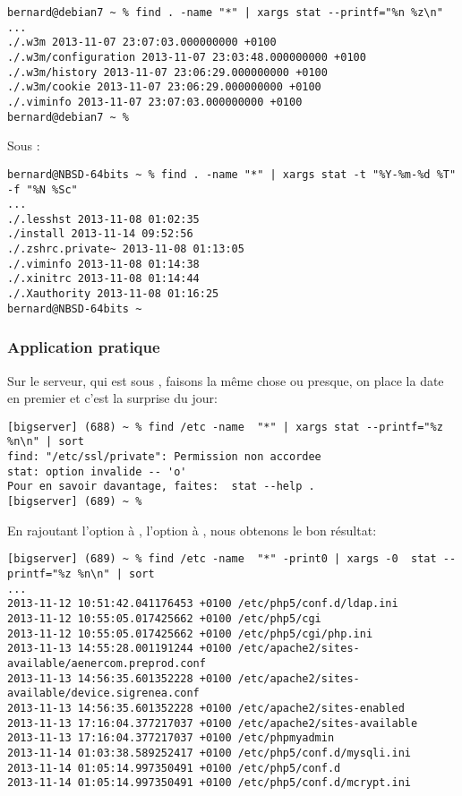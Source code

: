 \begin{lstlisting}
bernard@debian7 ~ % find . -name "*" | xargs stat --printf="%n %z\n"
...
./.w3m 2013-11-07 23:07:03.000000000 +0100
./.w3m/configuration 2013-11-07 23:03:48.000000000 +0100
./.w3m/history 2013-11-07 23:06:29.000000000 +0100
./.w3m/cookie 2013-11-07 23:06:29.000000000 +0100
./.viminfo 2013-11-07 23:07:03.000000000 +0100
bernard@debian7 ~ %
\end{lstlisting}

Sous \netbsd:

\begin{lstlisting}
bernard@NBSD-64bits ~ % find . -name "*" | xargs stat -t "%Y-%m-%d %T" -f "%N %Sc"
...
./.lesshst 2013-11-08 01:02:35
./install 2013-11-14 09:52:56
./.zshrc.private~ 2013-11-08 01:13:05
./.viminfo 2013-11-08 01:14:38
./.xinitrc 2013-11-08 01:14:44
./.Xauthority 2013-11-08 01:16:25
bernard@NBSD-64bits ~
\end{lstlisting}

\subsubsection{Application pratique}
Sur le serveur, qui est sous \linux, faisons la même chose ou presque, on place la date en premier et c'est la surprise du jour:

\begin{lstlisting}
[bigserver] (688) ~ % find /etc -name  "*" | xargs stat --printf="%z %n\n" | sort
find: "/etc/ssl/private": Permission non accordee
stat: option invalide -- 'o'
Pour en savoir davantage, faites:  stat --help .
[bigserver] (689) ~ %
\end{lstlisting}

En rajoutant l'option  à , l'option  à , nous obtenons le bon résultat:

\begin{lstlisting}
[bigserver] (689) ~ % find /etc -name  "*" -print0 | xargs -0  stat --printf="%z %n\n" | sort
...
2013-11-12 10:51:42.041176453 +0100 /etc/php5/conf.d/ldap.ini
2013-11-12 10:55:05.017425662 +0100 /etc/php5/cgi
2013-11-12 10:55:05.017425662 +0100 /etc/php5/cgi/php.ini
2013-11-13 14:55:28.001191244 +0100 /etc/apache2/sites-available/aenercom.preprod.conf
2013-11-13 14:56:35.601352228 +0100 /etc/apache2/sites-available/device.sigrenea.conf
2013-11-13 14:56:35.601352228 +0100 /etc/apache2/sites-enabled
2013-11-13 17:16:04.377217037 +0100 /etc/apache2/sites-available
2013-11-13 17:16:04.377217037 +0100 /etc/phpmyadmin
2013-11-14 01:03:38.589252417 +0100 /etc/php5/conf.d/mysqli.ini
2013-11-14 01:05:14.997350491 +0100 /etc/php5/conf.d
2013-11-14 01:05:14.997350491 +0100 /etc/php5/conf.d/mcrypt.ini
\end{lstlisting}

